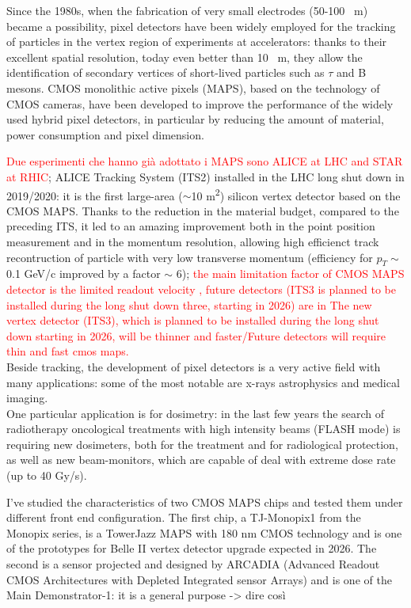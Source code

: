 \documentclass[a4paper]{report}
\newcommand{\red}[1]{\textcolor{red}{#1}}
\begin{document}
\linenumbers

Since the 1980s, when the fabrication of very small electrodes (50-100 \si{\mu m}) became a possibility, pixel detectors have been widely employed for the tracking of particles in the vertex region of experiments at accelerators: thanks to their excellent spatial resolution, today even better than 10 \si{\mu m}, they allow the identification of secondary vertices of short-lived particles such as $\tau$ and B mesons. 
CMOS monolithic active pixels (MAPS), based on the technology of CMOS cameras, have been developed to improve the performance of the widely used hybrid pixel detectors, in particular by reducing the amount of material, power consumption and pixel dimension.  

\red{Due esperimenti che hanno già adottato i MAPS sono ALICE at LHC and STAR at RHIC}; ALICE Tracking System (ITS2) installed in the LHC long shut down in 2019/2020: it is the first large-area ($\sim$10 \si{m^2}) silicon vertex detector based on the CMOS MAPS. Thanks to the reduction in the material budget, compared to the preceding ITS, it led to an amazing improvement both in the point position measurement and in the momentum resolution, allowing high efficienct track recontruction of particle with very low transverse momentum (efficiency for $p_{T}\sim$ 0.1 \si{GeV/c} improved by a factor $\sim$ 6); \red{the main limitation factor of CMOS MAPS detector is the limited readout velocity , future detectors (ITS3 is planned to be installed during the long shut down three, starting in 2026) are in 
The new vertex detector (ITS3), which is planned to be installed during the long shut down starting in 2026, will be thinner and faster/Future detectors will require thin and fast cmos maps.}\\

Beside tracking, the development of pixel detectors is a very active field with many applications: some of the most notable are x-rays astrophysics and medical imaging.\\
One particular application is for dosimetry: in the last few years the search of radiotherapy oncological treatments with high intensity beams (FLASH mode) is requiring new dosimeters, both for the treatment and for radiological protection, as well as new beam-monitors, which are capable of deal with extreme dose rate (up to 40 \si{Gy/s}).

I've studied the characteristics of two CMOS MAPS chips and tested them under different front end configuration. The first chip, a TJ-Monopix1 from the Monopix series, is a TowerJazz MAPS with 180 nm CMOS technology and is one of the prototypes for Belle II vertex detector upgrade expected in 2026. The second is a sensor projected and designed by ARCADIA (Advanced Readout CMOS Architectures with Depleted Integrated sensor Arrays) and is one of the Main Demonstrator-1: it is a general purpose -> dire così
 
\end{document}
